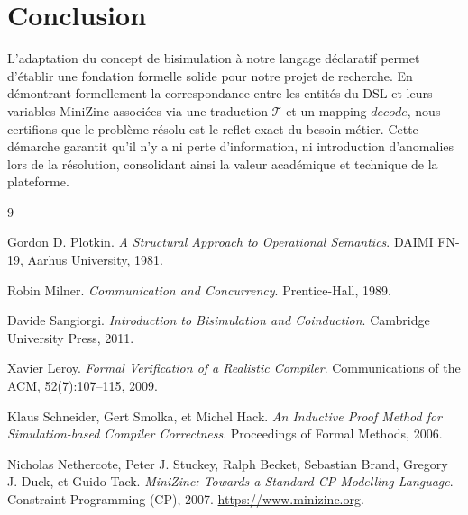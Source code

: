 \documentclass[12pt,a4paper]{article}
\begin{document}
\section{Conclusion}
L'adaptation du concept de bisimulation à notre langage déclaratif permet d'établir une fondation formelle solide pour notre projet de recherche. En démontrant formellement la correspondance entre les entités du DSL et leurs variables MiniZinc associées via une traduction $\mathcal{T}$ et un mapping $decode$, nous certifions que le problème résolu est le reflet exact du besoin métier. Cette démarche garantit qu'il n'y a ni perte d'information, ni introduction d'anomalies lors de la résolution, consolidant ainsi la valeur académique et technique de la plateforme.

\begin{thebibliography}{9}

Gordon D. Plotkin.
\textit{A Structural Approach to Operational Semantics}.
DAIMI FN-19, Aarhus University, 1981.

Robin Milner.
\textit{Communication and Concurrency}.
Prentice-Hall, 1989.

Davide Sangiorgi.
\textit{Introduction to Bisimulation and Coinduction}.
Cambridge University Press, 2011.

Xavier Leroy.
\textit{Formal Verification of a Realistic Compiler}.
Communications of the ACM, 52(7):107--115, 2009.

Klaus Schneider, Gert Smolka, et Michel Hack.
\textit{An Inductive Proof Method for Simulation-based Compiler Correctness}.
Proceedings of Formal Methods, 2006.

Nicholas Nethercote, Peter J. Stuckey, Ralph Becket, Sebastian Brand, Gregory J. Duck, et Guido Tack.
\textit{MiniZinc: Towards a Standard CP Modelling Language}.
Constraint Programming (CP), 2007. \url{https://www.minizinc.org}.

\end{thebibliography}
\end{document}

